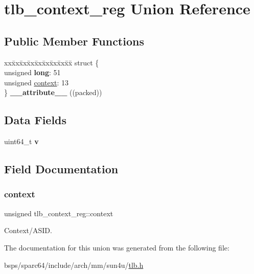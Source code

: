 \hypertarget{uniontlb__context__reg}{}\section{tlb\+\_\+context\+\_\+reg Union Reference}
\label{uniontlb__context__reg}
\subsection*{Public Member Functions}
\begin{DoxyCompactItemize}
\item 
\mbox{\label{uniontlb__context__reg_a774855a8523d41668f24df0b385640c5}} 
\begin{tabbing}
xx\=xx\=xx\=xx\=xx\=xx\=xx\=xx\=xx\=\kill
struct \{\\
\>unsigned {\bfseries long}: 51\\
\>unsigned \mbox{\hyperlink{uniontlb__context__reg_a7c3a7730ccd7dbe39b1b0f5b622bc9b2}{context}}: 13\\
\} {\bfseries \_\_attribute\_\_} ((packed))\\

\end{tabbing}\end{DoxyCompactItemize}
\subsection*{Data Fields}
\begin{DoxyCompactItemize}
\item 
\mbox{\label{uniontlb__context__reg_a72f35bef450a599bc0e2acff0bd33fe2}} 
uint64\+\_\+t {\bfseries v}
\end{DoxyCompactItemize}


\subsection{Field Documentation}
\mbox{\label{uniontlb__context__reg_a7c3a7730ccd7dbe39b1b0f5b622bc9b2}} 
\subsubsection{\texorpdfstring{context}{context}}
{\footnotesize\ttfamily unsigned tlb\+\_\+context\+\_\+reg\+::context}

Context/\+A\+S\+ID. 

The documentation for this union was generated from the following file\+:\begin{DoxyCompactItemize}
\item 
bsps/sparc64/include/arch/mm/sun4u/\mbox{\hyperlink{sun4u_2tlb_8h}{tlb.\+h}}\end{DoxyCompactItemize}
